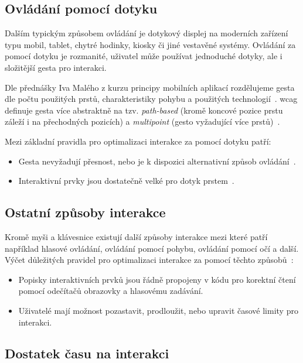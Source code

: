 \subsection{Ovládání pomocí dotyku}

Dalším typickým způsobem ovládání je dotykový displej na moderních zařízení typu mobil, tablet, chytré hodinky, kiosky či jiné vestavěné systémy.
Ovládání za pomocí dotyku je rozmanité, uživatel může používat jednoduché dotyky, ale i složitější gesta pro interakci.

Dle přednášky Iva Malého z kurzu principy mobilních aplikací rozdělujeme gesta dle počtu použitých prstů, charakteristiky pohybu a použitých technologií~\cite{ctu-pda-11}.
\gls{wcag} definuje gesta více abstraktně na tzv. \textit{path-based} (kromě koncové pozice prstu záleží i na přechodných pozicích) a \textit{multipoint} (gesto vyžadující více prstů)~\cite{wcag-pointer-gestures}.

Mezi základní pravidla pro optimalizaci interakce za pomocí dotyku patří:

\begin{itemize}
    \item Gesta nevyžadují přesnost, nebo je k dispozici alternativní způsob ovládání~\cite{wcag-pointer-gestures}.
    \item Interaktivní prvky jsou dostatečně velké pro dotyk prstem~\cite{wcag-target-size}.
\end{itemize}

\subsection{Ostatní způsoby interakce}

Kromě myši a klávesnice existují další způsoby interakce mezi které patří například hlasové ovládání, ovládání pomocí pohybu, ovládání pomocí očí a další.
Výčet důležitých pravidel pro optimalizaci interakce za pomocí těchto způsobů~\cite{w3-accessibility-principles}:

\begin{itemize}
    \item Popisky interaktivních prvků jsou řádně propojeny v kódu pro korektní čtení pomocí odečítačů obrazovky a hlasovému zadávání.
    \item Uživatelé mají možnost pozastavit, prodloužit, nebo upravit časové limity pro interakci.
\end{itemize}

\subsection{Dostatek času na interakci}


